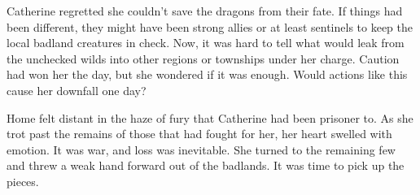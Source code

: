 \begin{multicols*}{2}
Catherine regretted she couldn't save the dragons from their fate. If things had been different, they might have been strong allies or at least sentinels to keep the local badland creatures in check. Now, it was hard to tell what would leak from the unchecked wilds into other regions or townships under her charge. Caution had won her the day, but she wondered if it was enough. Would actions like this cause her downfall one day?

Home felt distant in the haze of fury that Catherine had been prisoner to. As she trot past the remains of those that had fought for her, her heart swelled with emotion. It was war, and loss was inevitable. She turned to the remaining few and threw a weak hand forward out of the badlands. It was time to pick up the pieces.


\end{multicols*}





